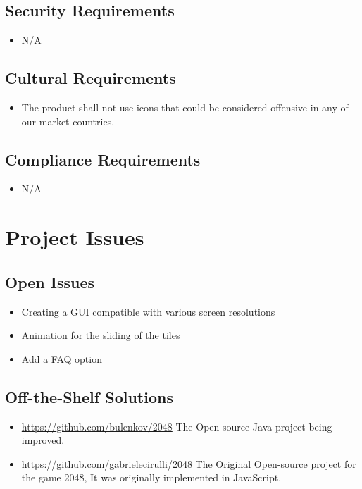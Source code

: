 \documentclass[12pt]{article}
\begin{document}
\subsection{Security Requirements}
\begin{itemize}
    \item N/A
\end{itemize}

\subsection{Cultural Requirements}
\begin{itemize}
    \item The product shall not use icons that could be considered offensive in any of our market countries.
\end{itemize}

\subsection{Compliance Requirements}
\begin{itemize}
    \item N/A
\end{itemize}

\section{Project Issues}
\subsection{Open Issues}
\begin{itemize}
	\item Creating a GUI compatible with various screen resolutions
	\item Animation for the sliding of the tiles
	\item Add a FAQ option
\end{itemize}

\subsection{Off-the-Shelf Solutions}
\begin{itemize}
	\item \url{https://github.com/bulenkov/2048} The Open-source Java project being improved.
	\item \url{https://github.com/gabrielecirulli/2048} The Original Open-source 	project for the game 2048, It was originally implemented in JavaScript.
\end{itemize}
\end{document}
